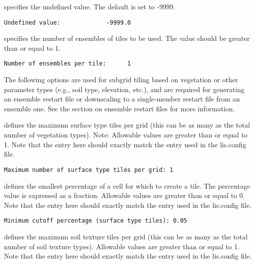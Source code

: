  
  specifies the undefined value.
 The default is set to -9999.
 

 \begin{Verbatim}[frame=single]
Undefined value:             -9999.0
 \end{Verbatim}

 
  specifies the number of
 ensembles of tiles to be used. The value should be greater than
 or equal to 1.
 

 \begin{Verbatim}[frame=single]
Number of ensembles per tile:      1
 \end{Verbatim}

 
 The following options are used for subgrid tiling based on vegetation or other
  parameter types (e.g., soil type, elevation, etc.),
  and are required for generating an ensemble restart file or downscaling
  to a single-member restart file from an ensemble one. See the section
  on ensemble restart files for more information.

  defines the
 maximum surface type tiles per grid (this can be as many as the total
 number of vegetation types). 
 Note:
 Allowable values are greater than or equal to 1. Note that the entry
 here should exactly match the entry used in the lis.config file.
 

 \begin{Verbatim}[frame=single]
Maximum number of surface type tiles per grid: 1
 \end{Verbatim}

 
  defines the
 smallest percentage of a cell for which to create a tile.
 The percentage value is expressed as a fraction.
 Allowable values are greater than or equal to 0. Note that the entry
 here should exactly match the entry used in the lis.config file. 
 

 \begin{Verbatim}[frame=single]
Minimum cutoff percentage (surface type tiles): 0.05
 \end{Verbatim}

 
  defines the
 maximum soil texture tiles per grid (this can be as many as the total
 number of soil texture types). 
 Allowable values are greater than or equal to 1. Note that the entry
 here should exactly match the entry used in the lis.config file. 
 

